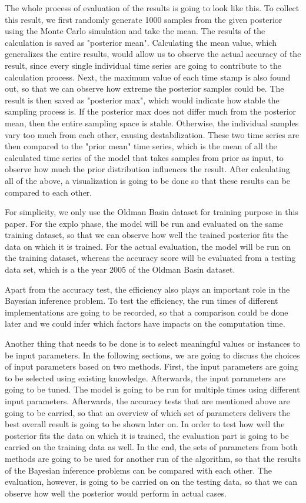 The whole process of evaluation of the results is going to look like this. 
To collect this result, we first randomly generate 1000 samples from the given posterior using the Monte Carlo simulation \cite{monte_carlo_simulation} and take the mean. The results of the calculation is saved as "posterior mean". Calculating the mean value, which generalizes the entire results, would allow us to observe the actual accuracy of the result, since every single individual time series are going to contribute to the calculation process. Next, the maximum value of each time stamp is also found out, so that we can observe how extreme the posterior samples could be. The result is then saved as "posterior max", which would indicate how stable the sampling process is. If the posterior max does not differ much from the posterior mean, then the entire sampling space is stable. Otherwise, the individual samples vary too much from each other, causing destabilization. These two time series are then compared to the "prior mean" time series, which is the mean of all the calculated time series of the model that takes samples from prior as input, to observe how much the prior distribution influences the result. After calculating all of the above, a visualization is going to be done so that these results can be compared to each other. 

For simplicity, we only use the Oldman Basin dataset for training purpose in this paper. For the explo phase, the model will be run and evaluated on the same training dataset, so that we can observe how well the trained posterior fits the data on which it is trained. For the actual evaluation, the model will be run on the training dataset, whereas the accuracy score will be evaluated from a testing data set, which is a the year 2005 of the Oldman Basin dataset.

Apart from the accuracy test, the efficiency also plays an important role in the Bayesian inference problem. To test the efficiency, the run times of different implementations are going to be recorded, so that a comparison could be done later and we could infer which factors have impacts on the computation time.

Another thing that needs to be done is to select meaningful values or instances to be input parameters. In the following sections, we are going to discuss the choices of input parameters based on two methods. First, the input parameters are going to be selected using existing knowledge. Afterwards, the input parameters are going to be tuned. The model is going to be run for multiple times using different input parameters. Afterwards, the accuracy tests that are mentioned above are going to be carried, so that an overview of which set of parameters delivers the best overall result is going to be shown later on. In order to test how well the posterior fits the data on which it is trained, the evaluation part is going to be carried on the training data as well. In the end, the sets of parameters from both methods are going to be used for another run of the algorithm, so that the results of the Bayesian inference problems can be compared with each other. The evaluation, however, is going to be carried on on the testing data, so that we can observe how well the posterior would perform in actual cases.

